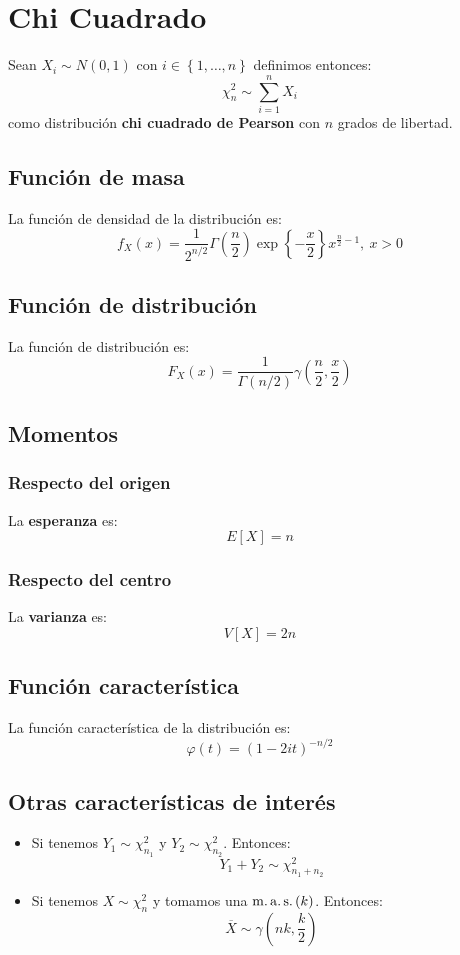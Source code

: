 \section{Chi Cuadrado}
\label{sec:chi_cuadrado}
Sean $X_i \sim N\left( 0, 1 \right)$ con $i \in \left\{ 1, \ldots, n \right\}$ definimos entonces:
\[
\chi^2_n \sim \sum_{i=1}^{n} X_i
\]
como distribución \textbf{chi cuadrado de Pearson} con $n$ grados de libertad.

\subsection{Función de masa}
La función de densidad de la distribución es:
\[
f_X \left( x \right) = \frac{1}{2^{n/2}}\Gamma\left( \frac{n}{2} \right)\exp\left\{ -\frac{x}{2} \right\} x^{\frac{n}{2} - 1},\ x > 0
\]

\subsection{Función de distribución}
La función de distribución es:
\[
F_X\left( x \right) = \frac{1}{\Gamma\left( n / 2 \right)}\gamma\left( \frac{n}{2}, \frac{x}{2} \right)
\]

\subsection{Momentos}

\subsubsection*{Respecto del origen}
La \textbf{esperanza} es: 
\[
    E\left[ X \right] = n
\]
\subsubsection*{Respecto del centro}
La \textbf{varianza} es:
\[
    V\left[ X \right] = 2n
\]

\subsection{Función característica}
La función característica de la distribución es:
\[
\varphi\left( t \right) = \left( 1 - 2it \right)^{-n/2}
\]

\subsection{Otras características de interés}
\begin{itemize}
    \item Si tenemos $Y_1 \sim \chi^2_{n_1}$ y $Y_2 \sim \chi^2_{n_2}$. Entonces:
    \[
    Y_1 + Y_2 \sim \chi^2_{n_1 + n_2}
    \]
    \item Si tenemos $X \sim \chi^2_n$ y tomamos una $\operatorname{m.a.s.}\left( k \right)$. Entonces:
    \[
    \overline{X} \sim \gamma\left( nk, \frac{k}{2} \right)
    \]
\end{itemize}
